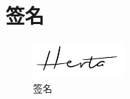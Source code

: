 \chapter{签名}

\begin{figure}[ht]
    \centering
    \includegraphics[width=100pt]{docs/imgs/herta}
    \caption{签名}
    \label{fig:figure2}
\end{figure}